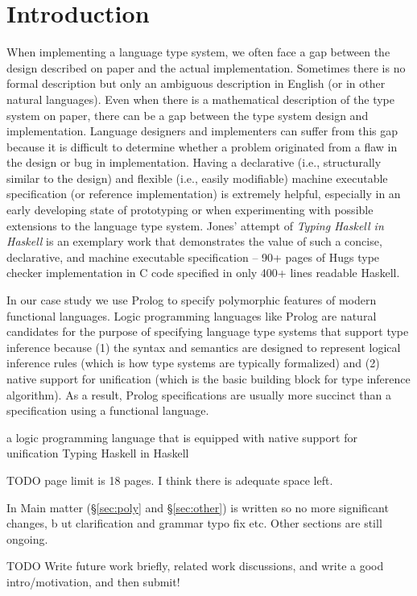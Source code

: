 \section{Introduction}\label{sec:intro}
When implementing a language type system, we often face a gap between
the design described on paper and the actual implementation. Sometimes
there is no formal description but only an ambiguous description in English
(or in other natural languages). Even when there is a mathematical description
of the type system on paper, there can be a gap between the type system design
and implementation. Language designers and implementers can suffer from this gap
because it is difficult to determine whether a problem originated from a flaw
in the design or bug in implementation.
Having a declarative (i.e., structurally similar to the design)
and flexible (i.e., easily modifiable) machine executable specification
(or reference implementation) is extremely helpful, especially
in an early developing state of prototyping or when experimenting with
possible extensions to the language type system.  
Jones' attempt of \emph{Typing Haskell in Haskell} \cite{JonesTHiH99} is
an exemplary work that demonstrates the value of such a concise, declarative,
and machine executable specification --
90+ pages of Hugs type checker implementation in C code specified in
only 400+ lines readable Haskell.

In our case study we use Prolog to specify polymorphic features of
modern functional languages. Logic programming languages like Prolog
are natural candidates for the purpose of specifying language type systems
that support type inference because (1) the syntax and semantics are
designed to represent logical inference rules (which is how type systems
are typically formalized) and (2) native support for unification (which
is the basic building block for type inference algorithm). As a result,
Prolog specifications are usually more succinct than a specification
using a functional language.

a logic programming language that is
equipped with native support for unification 
Typing Haskell in Haskell 

TODO page limit is 18 pages. I think there is adequate space left.

In 
Main matter (\S\ref{sec:poly} and \S\ref{sec:other}) is written
so no more significant changes, b ut clarification and grammar typo fix etc.
Other sections are still ongoing.

TODO
Write future work briefly, related work discussions, and write a good intro/motivation,
and then submit!

